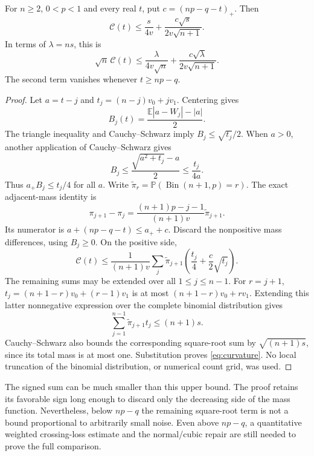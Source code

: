 \documentclass[11pt,a4paper]{article}
\newcommand{\E}{\mathbb E}\newcommand{\Pp}{\mathbb P}
\begin{document}
\begin{lemma}\label{lem:curvature}
For $n\ge2$, $0<p<1$ and every real $t$, put $c=(np-q-t)_+$.
Then
\begin{equation}\label{eq:curvature}
 \mathcal C(t)\le\frac{s}{4v}
             +\frac{c\sqrt s}{2v\sqrt{n+1}}.
\end{equation}
In terms of $\lambda=ns$, this is
\[
 \sqrt n\,\mathcal C(t)\le\frac{\lambda}{4v\sqrt n}
                +\frac{c\sqrt\lambda}{2v\sqrt{n+1}}.
\]
The second term vanishes whenever $t\ge np-q$.
\end{lemma}
\begin{proof}
Let $a=t-j$ and $t_j=(n-j)v_0+jv_1$. Centering gives
\[
 B_j(t)=\frac{\E|a-W_j|-|a|}{2}.
\]
The triangle inequality and Cauchy--Schwarz imply
$B_j\le\sqrt{t_j}/2$. When $a>0$, another application of
Cauchy--Schwarz gives
\[
 B_j\le\frac{\sqrt{a^2+t_j}-a}{2}\le\frac{t_j}{4a}.
\]
Thus $a_+B_j\le t_j/4$ for all $a$.
Write $\widetilde\pi_r=\Pp(\operatorname{Bin}(n+1,p)=r)$.
The exact adjacent-mass identity is
\[
 \pi_{j+1}-\pi_j
   =\frac{(n+1)p-j-1}{(n+1)v}\widetilde\pi_{j+1}.
\]
Its numerator is $a+(np-q-t)\le a_++c$. Discard the nonpositive
mass differences, using $B_j\ge0$. On the positive side,
\[
 \mathcal C(t)\le\frac1{(n+1)v}
   \sum_j\widetilde\pi_{j+1}
        \left(\frac{t_j}{4}+\frac c2\sqrt{t_j}\right).
\]
The remaining sums may be extended over all $1\le j\le n-1$.
For $r=j+1$, $t_j=(n+1-r)v_0+(r-1)v_1$ is at most
$(n+1-r)v_0+rv_1$. Extending this latter nonnegative expression over
the complete binomial distribution gives
\[
 \sum_{j=1}^{n-1}\widetilde\pi_{j+1}t_j\le(n+1)s.
\]
Cauchy--Schwarz also bounds the corresponding square-root sum by
$\sqrt{(n+1)s}$, since its total mass is at most one.
Substitution proves \eqref{eq:curvature}. No local truncation of the
binomial distribution, or numerical count grid, was used.
\end{proof}

The signed sum can be much smaller than this upper bound. The proof
retains its favorable sign long enough to discard only the decreasing
side of the mass function. Nevertheless, below $np-q$ the remaining
square-root term is not a bound proportional to arbitrarily small noise.
Even above $np-q$, a quantitative weighted crossing-loss estimate and the
normal/cubic repair are still needed to prove the full comparison.
\end{document}
